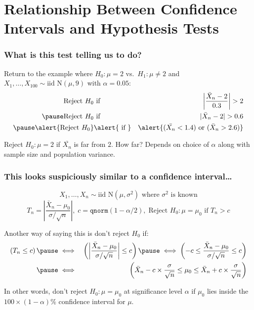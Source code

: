 \section{Relationship Between Confidence Intervals and Hypothesis Tests}
\begin{frame}
  \frametitle{What is this test telling us to do?}
  Return to the example where $H_0\colon \mu = 2$ vs.\ $H_1\colon \mu \neq 2$ and $X_1, \dots, X_{100} \sim \mbox{iid N}(\mu, 9)$ with $\alpha = 0.05$:
  \begin{eqnarray*}
    \mbox{Reject } H_0 &\mbox{ if }& \left|\frac{\bar{X}_n - 2}{0.3}\right| > 2\\\pause
     \mbox{Reject } H_0 &\mbox{ if }&|\bar{X}_n - 2| > 0.6 \\ \pause
     \alert{\mbox{Reject } H_0} &\alert{\mbox{ if }}& \alert{(\bar{X_n} < 1.4) \mbox{ or } (\bar{X}_n > 2.6)} 
  \end{eqnarray*}

  Reject $H_0\colon \mu = 2$ if $\bar{X_n}$ is far from $2$. 
  How far?
  Depends on choice of $\alpha$ along with sample size and population variance.
\end{frame}
\begin{frame}
  \frametitle{This looks suspiciously similar to a confidence interval\dots}

  \small 
  \[
    \boxed{X_1, \dots, X_n \sim \mbox{iid N}(\mu, \sigma^2) \mbox{ where }\sigma^2 \mbox{ is known}}
  \]
  \[
    \boxed{T_n = \displaystyle\left|\frac{\bar{X}_n - \mu_0}{\sigma/\sqrt{n}}\right|, \; c = \texttt{qnorm}(1 - \alpha/2), \; \mbox{Reject } H_0\colon \mu = \mu_0 \mbox{ if } T_n > c}
  \]

  \vspace{1em}
  Another way of saying this is don't reject $H_0$ if:
  \begin{eqnarray*}
    \left(T_n \leq c\right) \pause &\iff&
    \left(\left|\frac{\bar{X}_n - \mu_0}{\sigma/\sqrt{n}}\right| \leq c \right) \pause
    \iff \left(-c \leq \frac{\bar{X}_n - \mu_0}{\sigma/\sqrt{n}}\leq c\right)\\ \pause
    &\iff& \left(\bar{X}_n - c \times \frac{\sigma}{\sqrt{n}} \leq \mu_0 \leq \bar{X}_n + c\times\frac{\sigma}{\sqrt{n}}  \right)
  \end{eqnarray*}

  \pause

  \alert{In other words, don't reject $H_0\colon \mu = \mu_0$ at significance level $\alpha$ if $\mu_0$ lies inside the $100 \times (1 - \alpha)\%$ confidence interval for $\mu$.}

\end{frame}
